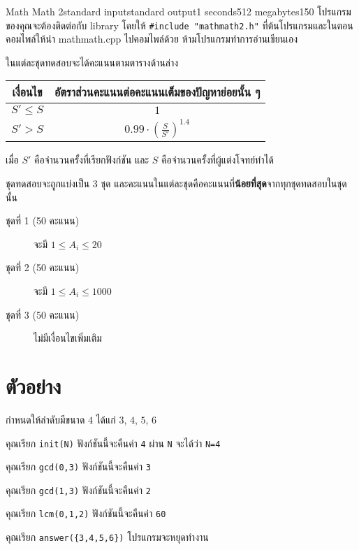 \documentclass[11pt,a4paper]{article}
\begin{document}
\begin{problem}{Math Math 2}{standard input}{standard output}{1 seconds}{512 megabytes}{150}
โปรแกรมของคุณจะต้องติดต่อกับ library  โดยให้ \verb|#include "mathmath2.h"| ที่ต้นโปรแกรมและในตอนคอมไพล์ให้นำ mathmath.cpp ไปคอมไพล์ด้วย ห้ามโปรแกรมทำการอ่านเขียนเอง

\Scoring

ในแต่ละชุดทดสอบจะได้คะแนนตามตารางด้านล่าง

\begin{center}
    \begin{tabular}{|c|c|}
        \hline
        \textbf{เงื่อนไข} & \textbf{อัตราส่วนคะแนนต่อคะแนนเต็มของปัญหาย่อยนั้น ๆ} \\
        \hline
        $S'\leq S$ & $1$ \\
        \hline
        \rule{0pt}{2pt}\centering $S'>S$ & $0.99\cdot(\frac{S}{S'})^{1.4}$ \\
        \hline
    \end{tabular}
\end{center}

เมื่อ $S'$ คือจำนวนครั้งที่เรียกฟังก์ชัน และ $S$ คือจำนวนครั้งที่ผู้แต่งโจทย์ทำได้

ชุดทดสอบจะถูกแบ่งเป็น 3 ชุด และคะแนนในแต่ละชุดคือคะแนนที่\textbf{น้อยที่สุด}จากทุกชุดทดสอบในชุดนั้น

\begin{description}

\item[ชุดที่ 1 (50 คะแนน)] จะมี $1\leq A_i\leq 20$
\item[ชุดที่ 2 (50 คะแนน)] จะมี $1\leq A_i\leq 1000$
\item[ชุดที่ 3 (50 คะแนน)] ไม่มีเงื่อนไขเพิ่มเติม

\end{description}

\section*{ตัวอย่าง}

กำหนดให้ลำดับมีขนาด $4$ ได้แก่ $3$, $4$, $5$, $6$

คุณเรียก \verb|init(N)| ฟังก์ชันนี้จะคืนค่า \verb|4| ผ่าน \verb|N| จะได้ว่า \verb|N=4|

คุณเรียก \verb|gcd(0,3)| ฟังก์ชันนี้จะคืนค่า \verb|3|

คุณเรียก \verb|gcd(1,3)| ฟังก์ชันนี้จะคืนค่า \verb|2|

คุณเรียก \verb|lcm(0,1,2)| ฟังก์ชันนี้จะคืนค่า \verb|60|

คุณเรียก \verb|answer({3,4,5,6})| โปรแกรมจะหยุดทำงาน

\end{problem}
\end{document}
